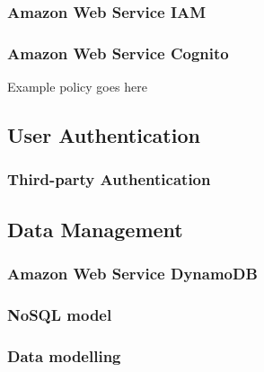 \documentclass[a4paper, 11pt]{article}
\begin{document}

\subsubsection{Amazon Web Service IAM}


\subsubsection{Amazon Web Service Cognito}

Example policy goes here

\subsection{User Authentication}
\subsubsection{Third-party Authentication}



\subsection{Data Management}
\subsubsection{Amazon Web Service DynamoDB}

\subsubsection{NoSQL model}
\subsubsection{Data modelling} 
\end{document}
